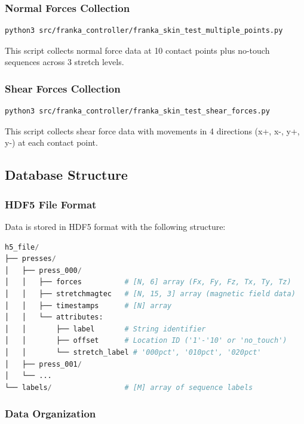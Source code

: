 \documentclass[11pt,a4paper]{article}
\begin{document}
\subsubsection{Normal Forces Collection}

\begin{lstlisting}[language=bash]
python3 src/franka_controller/franka_skin_test_multiple_points.py
\end{lstlisting}

This script collects normal force data at 10 contact points plus no-touch sequences across 3 stretch levels.

\subsubsection{Shear Forces Collection}

\begin{lstlisting}[language=bash]
python3 src/franka_controller/franka_skin_test_shear_forces.py
\end{lstlisting}

This script collects shear force data with movements in 4 directions (x+, x-, y+, y-) at each contact point.

\subsection{Database Structure}

\subsubsection{HDF5 File Format}

Data is stored in HDF5 format with the following structure:

\begin{lstlisting}[language=Python]
h5_file/
├── presses/
│   ├── press_000/
│   │   ├── forces          # [N, 6] array (Fx, Fy, Fz, Tx, Ty, Tz)
│   │   ├── stretchmagtec   # [N, 15, 3] array (magnetic field data)
│   │   ├── timestamps      # [N] array
│   │   └── attributes:
│   │       ├── label       # String identifier
│   │       ├── offset      # Location ID ('1'-'10' or 'no_touch')
│   │       └── stretch_label # '000pct', '010pct', '020pct'
│   ├── press_001/
│   └── ...
└── labels/                 # [M] array of sequence labels
\end{lstlisting}

\subsubsection{Data Organization}
\end{document}
